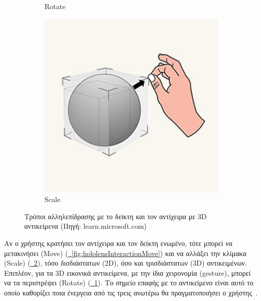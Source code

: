 \begin{enumerate}
\begin{figure}[!ht]
\begin{subfigure}{0.3\textwidth}
            \caption{Rotate}\label{fig:hololensInteractionRotate}
        \end{subfigure}%
        \begin{subfigure}{0.3\textwidth}
            \centering
            \includegraphics[width=0.9\linewidth]{images/hololens_interaction_scale.jpg}
            \caption{Scale}\label{fig:hololensInteractionScale}
        \end{subfigure}%
        \caption[Τρόποι αλληλεπίδρασης με το δείκτη και τον αντίχειρα με 3D αντικείμενα]{Τρόποι αλληλεπίδρασης με το δείκτη και τον αντίχειρα με 3D αντικείμενα {\footnotesize (Πηγή: learn.microsoft.com)}}\label{fig:hololensInteraction3D}
    \end{figure}
    
    Αν ο χρήστης κρατήσει τον αντίχειρα και τον δείκτη ενωμένο, τότε μπορεί να μετακινήσει (Move) (\hyperref[fig:hololensInteractionMove]{\schema~\ref*{fig:hololensInteractionMove}}) και να αλλάξει την κλίμακα (Scale) (\hyperref[fig:hololensInteractionScale]{\schema~\ref*{fig:hololensInteractionScale}}), τόσο δισδιάστατων (2D), όσο και τρισδιάστατων (3D) αντικειμένων. Επιπλέον, για τα 3D εικονικά αντικείμενα, με την ίδια χειρονομία (gesture), μπορεί να τα περιστρέψει (Rotate) (\hyperref[fig:hololensInteractionRotate]{\schema~\ref*{fig:hololensInteractionRotate}}). Το σημείο επαφής με το αντικείμενο είναι αυτό το οποίο καθορίζει ποια ένεργεια από τις τρεις ανωτέρω θα πραγματοποιήσει ο χρήστης~\cite{caseymeekhof_2022_direct}.
    

\end{enumerate}
